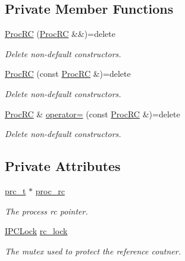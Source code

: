 \subsection*{Private Member Functions}
\begin{DoxyCompactItemize}
\item 
\hyperlink{class_proc_r_c_a59f158e2dc9b70a8ef59753db84b81b5}{Proc\+RC} (\hyperlink{class_proc_r_c}{Proc\+RC} \&\&)=delete
\begin{DoxyCompactList}\small\item\em Delete non-\/default constructors. \end{DoxyCompactList}\item 
\hyperlink{class_proc_r_c_a3b1ea79bd4591511fb1808d36c7493ac}{Proc\+RC} (const \hyperlink{class_proc_r_c}{Proc\+RC} \&)=delete
\begin{DoxyCompactList}\small\item\em Delete non-\/default constructors. \end{DoxyCompactList}\item 
\hyperlink{class_proc_r_c}{Proc\+RC} \& \hyperlink{class_proc_r_c_a58ddcf9743582319b41fe2bd88e1dbc5}{operator=} (const \hyperlink{class_proc_r_c}{Proc\+RC} \&)=delete
\begin{DoxyCompactList}\small\item\em Delete non-\/default constructors. \end{DoxyCompactList}\end{DoxyCompactItemize}
\subsection*{Private Attributes}
\begin{DoxyCompactItemize}
\item 
\hyperlink{proc__rc_8hpp_a4e61911b35a8dfa15356d5296f46d87a}{prc\+\_\+t} $\ast$ \hyperlink{class_proc_r_c_a1d54be5db7bf788526db8b4ad7a865b8}{proc\+\_\+rc}
\begin{DoxyCompactList}\small\item\em The process rc pointer. \end{DoxyCompactList}\item 
\hyperlink{class_i_p_c_lock}{I\+P\+C\+Lock} \hyperlink{class_proc_r_c_a37de2551af458d21bdb7291ba02fabb4}{rc\+\_\+lock}
\begin{DoxyCompactList}\small\item\em The mutex used to protect the reference coutner. \end{DoxyCompactList}\end{DoxyCompactItemize}
